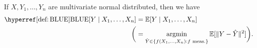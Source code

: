 
\begin{lemma}\label{lem: blue is cond. expectation}
	If \(X,Y_1,\dots, Y_n\) are multivariate normal distributed, then we
	have
	\begin{align*}
		\BLUE[Y\mid X_1,\dots,X_n]
		&= \E[Y\mid X_1,\dots, X_n]\\
		\bigg(&=
		\argmin_{\hat{Y}\in\{f(X_1,\dots, X_n) : f\text{ meas.}\}} \E[\|Y-\hat{Y}\|^2]
		\bigg).
	\end{align*}
\end{lemma}
